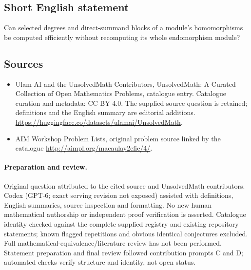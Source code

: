 \documentclass[11pt]{article}
\begin{document}
\subsection{Short English statement}
Can selected degrees and direct-summand blocks of a module's homomorphisms be computed efficiently without recomputing its whole endomorphism module?
\subsection{Sources}
\begin{itemize}
\item[\hypertarget{source:statement:1}{S1}] Ulam AI and the UnsolvedMath Contributors, UnsolvedMath: A Curated Collection of Open Mathematics Problems, catalogue entry. Catalogue curation and metadata: CC BY 4.0. The supplied source question is retained; definitions and the English summary are editorial additions.
\url{https://huggingface.co/datasets/ulamai/UnsolvedMath}.
\item[\hypertarget{source:statement:2}{S2}] AIM Workshop Problem Lists, original problem source linked by the catalogue
\url{http://aimpl.org/macaulay2efie/4/}.
\end{itemize}
\paragraph{Preparation and review.}
Original question attributed to the cited source and UnsolvedMath contributors. Codex (GPT-6; exact serving revision not exposed) assisted with definitions, English summaries, source inspection and formatting. No new human mathematical authorship or independent proof verification is asserted. Catalogue identity checked against the complete supplied registry and existing repository statements; known flagged repetitions and obvious identical conjectures excluded. Full mathematical-equivalence/literature review has not been performed. Statement preparation and final review followed contribution prompts C and D; automated checks verify structure and identity, not open status.
\label{end:statement}
\end{document}
